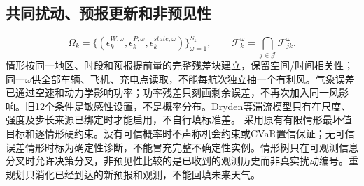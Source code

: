 \subsection*{共同扰动、预报更新和非预见性}
\begin{equation}
 \Omega_k=\{(\epsilon^{W,\omega}_{k},\epsilon^{P,\omega}_{k},
             \epsilon^{state,\omega}_{k})\}_{\omega=1}^{S_k},\qquad
 \mathcal F_k^\omega=\bigcap_{j\in\mathcal J}\mathcal F_{jk}^\omega.
 \label{eng:eq:jointscenario}
\end{equation}
\noindent 情形按同一地区、时段和预报提前量的完整残差块建立，保留空间/时间相关性；同一$\omega$供全部车辆、飞机、充电点读取，不能每航次独立抽一个有利风。气象误差已通过空速和动力学影响功率；功率残差只刻画剩余误差，不再次加入同一风影响。旧12个条件是敏感性设置，不是概率分布。Dryden等湍流模型只有在尺度、强度及步长来源已绑定时才能启用，不自行填标准差。
\noindent 采用原有有限情形最坏值目标和逐情形硬约束。没有可信概率时不声称机会约束或CVaR置信保证；无可信误差情形时标为确定性诊断，不能冒充完整不确定性实例。情形树只在可观测信息分叉时允许决策分叉，非预见性比较的是已收到的观测历史而非真实扰动编号。重规划只消化已经到达的新预报和观测，不能回填未来天气。
\clearpage
